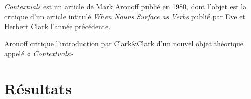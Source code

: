 \documentclass[a4paper,12pt]{article}
\author{Arthur Lapraye}
\begin{document}
 
 \maketitle
 
 \textit{Contextuals} est un article de Mark Aronoff publié en 1980, dont l'objet est la critique d'un article intitulé 
 \textit{When Nouns Surface as Verbs} publié par Eve et Herbert Clark l'année précédente. 
 
 Aronoff critique l'introduction par Clark&Clark d'un nouvel objet théorique appelé « \textit{Contextuals}»
 
 

 \section*{Résultats}
 
  
 
\end{document}
